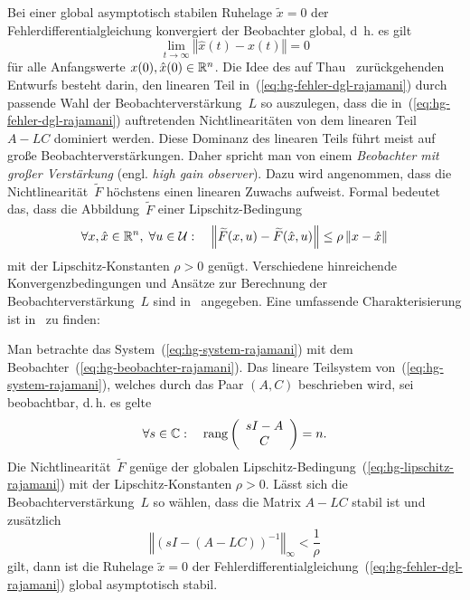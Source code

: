 Bei einer global asymptotisch stabilen Ruhelage $\tilde{x}=0$ der
Fehlerdifferentialgleichung konvergiert der Beobachter global, d~h.
es gilt 
\begin{equation}
\lim_{t\to\infty}\left\Vert \hat{x}(t)-x(t)\right\Vert =0\label{eq:hg-konvergenz-rajamani}
\end{equation}
für alle Anfangswerte $x(0),\hat{x}(0)\in{\mathbb{R}}^{n}$. Die Idee des auf
Thau~\cite{thau1973} zurückgehenden Entwurfs besteht darin, den
linearen Teil in~(\ref{eq:hg-fehler-dgl-rajamani}) durch passende
Wahl der Beobachterverstärkung~$L$ so auszulegen, dass die in~(\ref{eq:hg-fehler-dgl-rajamani})
auftretenden Nichtlinearitäten von dem linearen Teil $A-LC$ dominiert
werden. Diese Dominanz des linearen Teils führt meist auf große Beobachterverstärkungen.
Daher spricht man von einem \emph{Beobachter mit großer Verstärkung}
(engl. \emph{high gain observer}). Dazu wird angenommen, dass die
Nichtlinearität~$\widetilde{F}$ höchstens einen linearen Zuwachs
aufweist. Formal bedeutet das, dass die Abbildung~$\widetilde{F}$
einer Lipschitz-Bedingung
\begin{equation}
\forall x,\hat{x}\in{\mathbb{R}}^{n},\;\forall u\in\mathcal{U}:\quad\left\Vert \widetilde{F}(x,u)-\widetilde{F}(\hat{x},u)\right\Vert \leq\rho\left\Vert x-\hat{x}\right\Vert \label{eq:hg-lipschitz-rajamani}
\end{equation}
mit der Lipschitz-Konstanten $\rho>0$ genügt. Verschiedene hinreichende
Konvergenzbedingungen und Ansätze zur Berechnung der Beobachterverstärkung~$L$
sind in~\cite{thau1973,raghavan1994,zak1990} angegeben. Eine umfassende
Charakterisierung ist in~\cite{rajamani1998} zu finden:
\begin{theorem}
\label{thm:Rajamani-hinreichend}Man betrachte das System~(\ref{eq:hg-system-rajamani})
mit dem Beobachter~(\ref{eq:hg-beobachter-rajamani}). Das lineare
Teilsystem von~(\ref{eq:hg-system-rajamani}), welches durch das
Paar $(A,C)$ beschrieben wird, sei beobachtbar,
d.\,h. es gelte
\[
\forall s\in{\mathbb{C}}:\quad{\operatorname{rang}}\left(\begin{array}{c}
sI-A\\
C
\end{array}\right)=n.
\]
Die Nichtlinearität~$\tilde{F}$ genüge der globalen Lipschitz-Bedingung~(\ref{eq:hg-lipschitz-rajamani})
mit der Lipschitz-Konstanten $\rho>0$. Lässt sich die Beobachterverstärkung~$L$
so wählen, dass die Matrix $A-LC$ stabil ist und zusätzlich
\begin{equation}
\left\Vert \left(sI-(A-LC)\right)^{-1}\right\Vert _{\infty}<\frac{1}{\rho}\label{eq:hg-norm-rajamani}
\end{equation}
gilt, dann ist die Ruhelage $\tilde{x}=0$ der Fehlerdifferentialgleichung~(\ref{eq:hg-fehler-dgl-rajamani})
global asymptotisch stabil.
\end{theorem}

